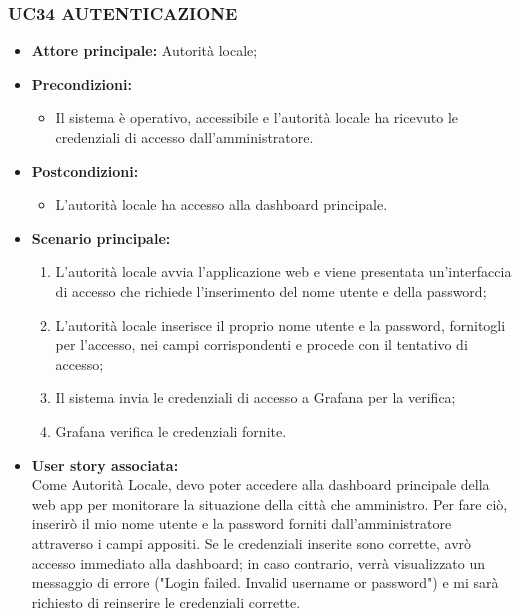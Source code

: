 \subsubsection{UC34 AUTENTICAZIONE}
\begin{itemize}
    \item \textbf{Attore principale:} Autorità locale;
    \item \textbf{Precondizioni:}
        \begin{itemize}
            \item Il sistema è operativo, accessibile e l’autorità locale ha ricevuto le credenziali di accesso dall'amministratore.
        \end{itemize}
    \item \textbf{Postcondizioni:}
        \begin{itemize}
            \item L’autorità locale ha accesso alla dashboard principale.
        \end{itemize}
    \item \textbf{Scenario principale:}
        \begin{enumerate}
            \item L'autorità locale avvia l'applicazione web e viene presentata un'interfaccia di accesso che richiede l'inserimento del nome utente e della password;
            \item L'autorità locale inserisce il proprio nome utente e la password, fornitogli per l’accesso, nei campi corrispondenti e procede con il tentativo di accesso;
            \item Il sistema invia le credenziali di accesso a Grafana per la verifica;
            \item Grafana verifica le credenziali fornite.
        \end{enumerate}
    \item \textbf{User story associata:} \\
    Come Autorità Locale, devo poter accedere alla dashboard principale della web app per monitorare la situazione della città che amministro. Per fare ciò, inserirò il mio nome utente e la password forniti dall'amministratore attraverso i campi appositi. Se le credenziali inserite sono corrette, avrò accesso immediato alla dashboard; in caso contrario, verrà visualizzato un messaggio di errore ("Login failed. Invalid username or password") e mi sarà richiesto di reinserire le credenziali corrette.
\end{itemize}